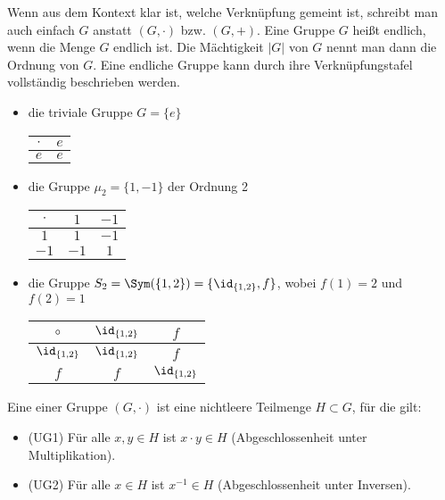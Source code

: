 \begin{remark}
	Wenn aus dem Kontext klar ist, welche Verknüpfung gemeint ist, schreibt man auch einfach
	$G$ anstatt $(G, \cdot)$ bzw. $(G,+)$. Eine Gruppe $G$ heißt endlich, wenn die Menge $G$ endlich
	ist. Die Mächtigkeit $|G|$ von $G$ nennt man dann die Ordnung von $G$. Eine endliche Gruppe kann 
	durch ihre Verknüpfungstafel vollständig beschrieben werden.
\end{remark}

\begin{example}
	\begin{itemize}
		\item die triviale Gruppe $G=\{e\}$
		\begin{center}
			\begin{tabular}{|c|c|}
				\hline
				$\cdot$ & $e$\\
				\hline
				$e$ & $e$ \\
				\hline
			\end{tabular}
		\end{center}
		\item die Gruppe $\mu_2 = \{1,-1\}$ der Ordnung 2
		\begin{center}
			\begin{tabular}{|c|c|c|}
				\hline
				$\cdot$ & $1$ & $-1$\\
				\hline
				$1$ & $1$ & $-1$ \\
				\hline
				$-1$ & $-1$ & $1$ \\
				\hline
			\end{tabular}
		\end{center}
		\item die Gruppe $S_2= \Sym(\{1,2\}) = \{\id_{\{1,2\}},f\}$, wobei $f(1)=2$ und $f(2)=1$
		\begin{center}
			\begin{tabular}{|c|c|c|}
				\hline
				$\circ$ & $\id_{\{1,2\}}$ & $f$\\
				\hline
				$\id_{\{1,2\}}$ & $\id_{\{1,2\}}$ & $f$ \\
				\hline
				$f$ & $f$ & $\id_{\{1,2\}}$ \\
				\hline
			\end{tabular}
		\end{center}
	\end{itemize}
\end{example}

\begin{definition}[Untergruppe]
	Eine  einer Gruppe $(G,\cdot)$ ist eine 
	nichtleere Teilmenge $H \subset G$, für die gilt:
	\begin{itemize}
		\item (UG1) Für alle $x,y \in H$ ist $x \cdot y \in H$ (Abgeschlossenheit unter Multiplikation).
		\item (UG2) Für alle $x \in H$ ist $x^{-1} \in H$ (Abgeschlossenheit unter Inversen).
	\end{itemize}
\end{definition}


